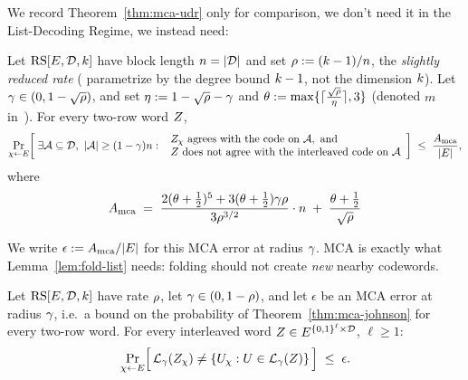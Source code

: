 We record Theorem~\ref{thm:mca-udr} only for comparison, we don't need it in the List-Decoding Regime, we instead need:

\begin{theorem}\label{thm:mca-johnson}
Let $\mathrm{RS}[E,\mathcal{D},k]$ have block length $n = |\mathcal{D}|$ and set $\rho := (k-1)/n$, the \emph{slightly reduced rate} (\cite{BCHKS25} parametrize by the degree bound $k - 1$, not the dimension $k$). Let $\gamma \in (0, 1-\sqrt{\rho})$, and set $\eta := 1 - \sqrt{\rho} - \gamma$ and $\theta := \max\{\lceil \tfrac{\sqrt{\rho}}{\eta} \rceil, 3\}$ (denoted $m$ in~\cite{BCHKS25}). For every two-row word $Z$,
\[
\Pr_{\chi \leftarrow E}\!\left[\; \exists \mathcal{A} \subseteq \mathcal{D},\ |\mathcal{A}| \ge (1-\gamma) n :\ \begin{array}{l} Z_\chi \text{ agrees with the code on } \mathcal{A}, \text{ and} \\ Z \text{ does not agree with the interleaved code on } \mathcal{A} \end{array} \right] \;\le\; \frac{A_{\mathrm{mca}}}{|E|},
\]
where
\[
A_{\mathrm{mca}} \;=\; \frac{2(\theta + \tfrac12)^5 + 3(\theta + \tfrac12)\gamma\rho}{3\rho^{3/2}} \cdot n \;+\; \frac{\theta + \tfrac12}{\sqrt{\rho}}
\]
\end{theorem}

We write $\epsilon := A_{\mathrm{mca}}/|E|$ for this MCA error at radius $\gamma$. MCA is exactly what Lemma~\ref{lem:fold-list} needs: folding should not create \emph{new} nearby codewords.

\begin{lemma}\label{lem:fold-list}
Let $\mathrm{RS}[E,\mathcal{D},k]$ have rate $\rho$, let $\gamma \in (0, 1-\rho)$, and let $\epsilon$ be an MCA error at radius $\gamma$, i.e.\ a bound on the probability of Theorem~\ref{thm:mca-johnson} for every two-row word. For every interleaved word $Z \in E^{\{0,1\}^{\ell} \times \mathcal{D}}$, $\ell \ge 1$:
\[
\Pr_{\chi \leftarrow E}\Bigl[\, \mathcal{L}_\gamma(Z_\chi) \neq \{ U_\chi : U \in \mathcal{L}_\gamma(Z) \} \,\Bigr] \;\le\; \epsilon .
\]
\end{lemma}

